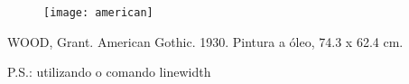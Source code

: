 \documentclass[				
a4paper,						
12pt,
brazil]{abntex2}
\begin{document}
	
\begin{figure}
\begin{center}
	\texttt{[image: american]}
\end{center}
\end{figure}

\begin{center}
	\small {WOOD, Grant. American Gothic. 1930. Pintura a óleo, 74.3 x 62.4 cm.}
\end{center}

	\scriptsize {P.S.: utilizando o comando linewidth}
\end{document}
